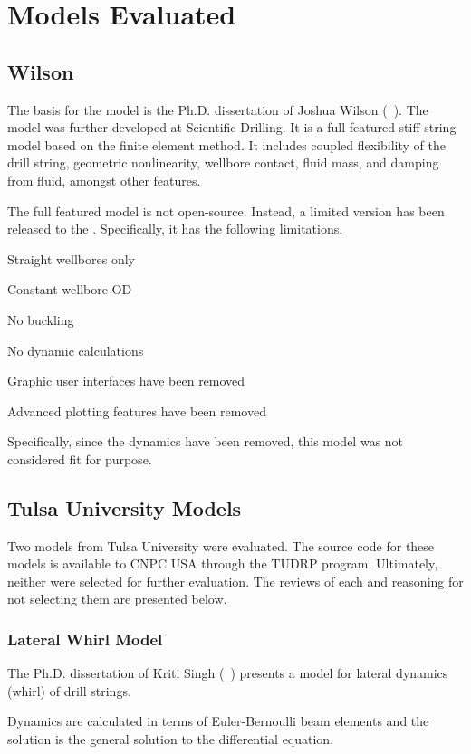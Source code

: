 \chapter{Models Evaluated}

\section{Wilson}
The basis for the model is the Ph.D. dissertation of Joshua Wilson (~\cite{ref:wilson2017a}).  The model was further developed at Scientific Drilling.  It is a full featured stiff-string model based on the finite element method.  It includes coupled flexibility of the drill string, geometric nonlinearity, wellbore contact, fluid mass, and damping from fluid, amongst other features.

The full featured model is not open-source.  Instead, a limited version has been released to the \osdc{}.  Specifically, it has the following limitations.
\begin{bulletedlist}
	\item Straight wellbores only
	\item Constant wellbore OD
	\item No buckling
	\item No dynamic calculations
	\item Graphic user interfaces have been removed
	\item Advanced plotting features have been removed
\end{bulletedlist}
Specifically, since the dynamics have been removed, this model was not considered fit for purpose.

\section{Tulsa University Models}
Two models from Tulsa University were evaluated.  The source code for these models is available to CNPC USA through the TUDRP program. Ultimately, neither were selected for further evaluation.  The reviews of each and reasoning for not selecting them are presented below.

\subsection{Lateral Whirl Model}
The Ph.D. dissertation of Kriti Singh (~\cite{ref:singh2019a}) presents a model for lateral dynamics (whirl) of drill strings.

Dynamics are calculated in terms of Euler-Bernoulli beam elements and the solution is the general solution to the differential equation.

